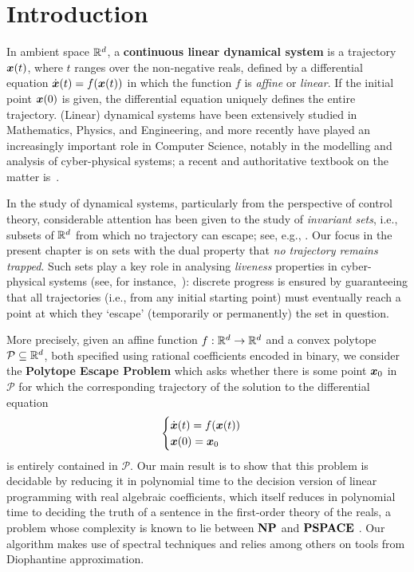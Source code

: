 \section{Introduction}

In ambient space $\mathbb{R}^{d}$, a \textbf{continuous linear
  dynamical system} is a trajectory $\boldsymbol{x}(t)$, where $t$
ranges over the non-negative reals, defined by a differential equation
$\dot{\boldsymbol{x}}(t)=f(\boldsymbol{x}(t))$ in which the function
$f$ is \emph{affine} or \emph{linear}. If the initial point
$\boldsymbol{x}(0)$ is given, the differential equation uniquely
defines the entire trajectory. (Linear) dynamical systems have been
extensively studied in Mathematics, Physics, and Engineering, and more
recently have played an increasingly important role in Computer
Science, notably in the modelling and analysis of cyber-physical
systems; a recent and authoritative textbook on the matter
is~\cite{Alu15}.

In the study of dynamical systems, particularly from the perspective
of control theory, considerable attention has been given to the study
of \emph{invariant sets}, i.e., subsets of $\mathbb{R}^{d}$ from which
no trajectory can escape; see, e.g.,
\cite{CastelanH92,BlondelT00,BM07,SDI08}. Our focus in the present
chapter is on sets with the dual property that \emph{no trajectory
  remains trapped}. Such sets play a key role in analysing
\emph{liveness} properties in cyber-physical systems (see, for
instance,~\cite{Alu15}): discrete progress is ensured by
guaranteeing that all trajectories (i.e., from any initial starting
point) must eventually reach a point at which they `escape'
(temporarily or permanently) the set in question.

More precisely, given an affine function
$f:\mathbb{R}^{d}\rightarrow \mathbb{R}^{d}$ and a convex polytope
$\mathcal{P}\subseteq\mathbb{R}^{d}$, both specified using rational
coefficients encoded in binary, we consider the \textbf{Polytope
  Escape Problem} which asks whether there is some point
$\boldsymbol{x}_0$ in $\mathcal{P}$ for which the corresponding
trajectory of the solution to the differential equation
\begin{equation*}
\begin{displaystyle} \begin{cases}
\dot{\myvector{x}}(t)=f(\myvector{x}(t)) \\
\myvector{x}(0)=\myvector{x}_{0}
\end{cases} \end{displaystyle}
\end{equation*}
is entirely contained in $\mathcal{P}$. Our main result is to show
that this problem is decidable by reducing it in polynomial time to
the decision version of linear programming with real algebraic
coefficients, which itself reduces in polynomial time to deciding the
truth of a sentence in the first-order theory of the reals, a problem
whose complexity is known to lie between $\textbf{NP}$ and
$\textbf{PSPACE}$ \cite{Canny88}. Our algorithm makes use of spectral
techniques and relies among others on tools from Diophantine
approximation.

